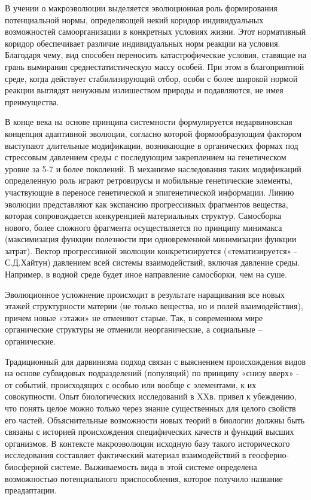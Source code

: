 \documentclass[exam_answers.tex]{subfiles}
\begin{document}
В учении о макроэволюции выделяется эволюционная роль формирования
потенциальной нормы, определяющей некий коридор индивидуальных
возможностей самоорганизации в конкретных условиях жизни. Этот
нормативный коридор обеспечивает различие индивидуальных норм реакции
на условия. Благодаря чему, вид способен переносить катастрофические
условия, ставящие на грань вымирания среднестатистическую массу особей.
При этом в благоприятной среде, когда действует стабилизирующий отбор,
особи с более широкой нормой реакции выглядят ненужным излишеством
природы и подавляются, не имея преимущества.

В конце века на основе принципа системности формулируется
недарвиновская концепция адаптивной эволюции, согласно которой
формообразующим фактором выступают длительные модификации,
возникающие в органических формах под стрессовым давлением среды с
последующим закреплением на генетическом уровне за 5-7 и более поколений.
В механизме наследования таких модификаций определенную роль играют
ретровирусы и мобильные генетические элементы, участвующие в переносе
генетической и эпигенетической информации. Линию эволюции представляют
как экспансию прогрессивных фрагментов вещества, которая сопровождается
конкуренцией материальных структур. Самосборка нового, более сложного
фрагмента осуществляется по принципу минимакса (максимизация функции
полезности при одновременной минимизации функции затрат). Вектор
прогрессивной эволюции конкретизируется («тематизируется» - С.Д.Хайтун)
давлением всей системы взаимодействий, включая давление среды. Например,
в водной среде будет иное направление самосборки, чем на суше.

Эволюционное усложнение происходит в результате наращивания все новых
этажей структурности материи (не только вещества, но и полей
взаимодействия), причем новые «этажи» не отменяют старые. Так, в
современном мире органические структуры не отменили неорганические, а
социальные – органические.

Традиционный для дарвинизма подход связан с выяснением
происхождения видов на основе субвидовых подразделений (популяций) по
принципу «снизу вверх» - от событий, происходящих с особью или вообще с
элементами, к их совокупности. Опыт биологических исследований в XXв.
привел к убеждению, что понять целое можно только через знание
существенных для целого свойств его частей.
 Объяснительные возможности
новых теорий в биологии должны быть связаны с историей происхождения
специфических качеств и функций высших организмов. В контексте
макроэволюции исходную базу такого исторического исследования составляет
фактический материал взаимодействий в геосферно-биосферной системе.
Выживаемость вида в этой системе определена возможностью потенциального
приспособления, которое получило название преадаптации.
\end{document}
